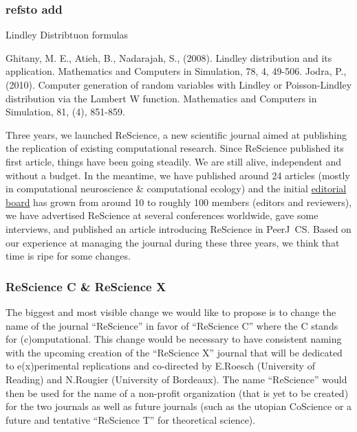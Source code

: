 \subsubsection{refsto add}

Lindley Distribtuon formulas

Ghitany, M. E., Atieh, B., Nadarajah, S., (2008). Lindley distribution and its application. Mathematics and Computers in Simulation, 78, 4, 49-506.
Jodra, P., (2010). Computer generation of random variables with Lindley or Poisson-Lindley distribution via the Lambert W function. Mathematics and Computers in Simulation, 81, (4), 851-859.


Three years, we launched ReScience, a new scientific journal aimed at publishing the
replication of existing computational research. Since ReScience published its first
article\supercite{Topalidou:2015}, things have been
going steadily. We are still alive, independent and without a budget. In the
meantime, we have published around 24 articles (mostly in computational
neuroscience \& computational ecology) and the initial
\href{https://rescience-c.github.io/board/}{editorial board} has grown from
around 10 to roughly 100 members (editors and reviewers), we have advertised
ReScience at several conferences worldwide, gave some
interviews\supercite{Science:2018}, and published an article introducing
ReScience in PeerJ~CS\supercite{Rougier:2017}. Based on our
experience\supercite{Rougier:2018} at managing the journal during these three
years, we think that time is ripe for some changes.

\subsubsection{ReScience C \& ReScience X}

The biggest and most visible change we would like to propose is to change the
name of the journal ``ReScience'' in favor of ``ReScience C'' where the C
stands for (c)omputational. This change would be necessary to have consistent
naming with the upcoming creation of the ``ReScience X'' journal that will be
dedicated to e(x)perimental replications and co-directed by E.Roesch
(University of Reading) and N.Rougier (University of Bordeaux). The name
``ReScience'' would then be used for the name of a non-profit organization
(that is yet to be created) for the two journals as well as future journals
(such as the utopian CoScience\supercite{Rougier:2017} or a future and
tentative ``ReScience T'' for theoretical science).


